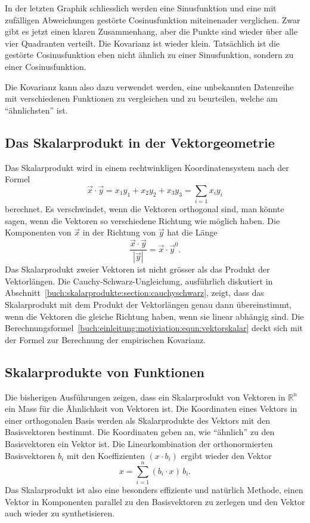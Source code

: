 In der letzten Graphik schliesslich werden eine Sinusfunktion und
eine mit zufälligen Abweichungen gestörte Cosinusfunktion miteinenader
verglichen.
Zwar gibt es jetzt einen klaren Zusammenhang, aber die Punkte sind
wieder über alle vier Quadranten verteilt.
Die Kovarianz ist wieder klein.
Tatsächlich ist die gestörte Cosinusfunktion eben nicht ähnlich zu 
einer Sinusfunktion, sondern zu einer Cosinusfunktion.



Die Kovarianz kann also dazu verwendet werden, eine unbekannten
Datenreihe mit verschiedenen Funktionen zu vergleichen und zu
beurteilen, welche am ``ähnlichsten'' ist.

%
%
\subsection{Das Skalarprodukt in der Vektorgeometrie}
Das Skalarprodukt wird in einem rechtwinkligen Koordinatensystem nach der
Formel
\begin{equation}
\vec{x}\cdot\vec{y} = x_1y_1 + x_2y_2 + x_3y_3 = \sum_{i=1} x_iy_i
\label{buch:einleitung:motiviation:equn:vektorskalar}
\end{equation}
berechnet.
Es verschwindet, wenn die Vektoren orthogonal sind, man könnte sagen,
wenn die Vektoren so verschiedene Richtung wie möglich haben.
Die Komponenten von $\vec{x}$ in der Richtung von $\vec{y}$ hat die
Länge 
\[
\frac{\vec{x}\cdot\vec{y}}{|\vec{y}|}
=
\vec{x}\cdot \vec{y}^0.
\]
Das Skalarprodukt zweier Vektoren ist nicht grösser als das Produkt
der Vektorlängen.
Die Cauchy-Schwarz-Ungleichung, ausführlich diskutiert in
Abschnitt~\ref{buch:skalarprodukte:section:cauchyschwarz},
zeigt, dass das Skalarprodukt mit dem Produkt der Vektorlängen
genau dann übereinstimmt, wenn die Vektoren die gleiche Richtung
haben, wenn sie linear abhängig sind.
Die Berechnungsformel~\eqref{buch:einleitung:motiviation:equn:vektorskalar}
deckt sich mit der Formel zur Berechnung der empirischen Kovarianz.

%
%
\subsection{Skalarprodukte von Funktionen}
Die bisherigen Ausführungen zeigen, dass ein Skalarprodukt von
Vektoren in $\mathbb{R}^n$ ein Mass für die Ähnlichkeit von Vektoren
ist. 
Die Koordinaten eines Vektors in einer orthogonalen Basis werden
als Skalarprodukte des Vektors mit den Basisvektoren bestimmt.
Die Koordinaten geben an, wie ``ähnlich'' zu den Basisvektoren ein Vektor
ist.
Die Linearkombination der orthonormierten Basisvektoren $b_i$ mit den
Koeffizienten $(x\cdot b_i)$ ergibt wieder den Vektor 
\[
x = \sum_{i=1}^n (b_i\cdot x) \, b_i.
\]
Das Skalarprodukt ist also eine besonders effiziente und natürlich
Methode, einen Vektor in Komponenten parallel zu den Basisvektoren
zu zerlegen und den Vektor auch wieder zu synthetisieren.

